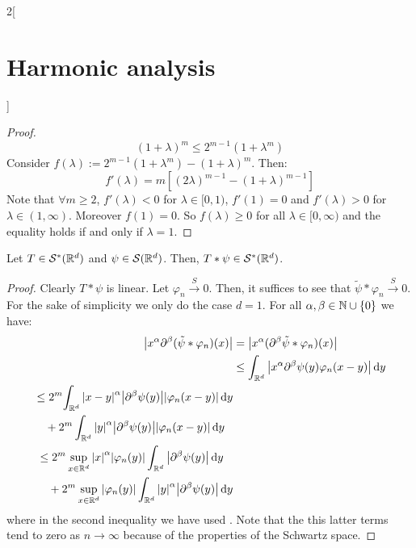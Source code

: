 \documentclass[../../../main_math.tex]{subfiles}
\begin{document}
\begin{multicols}{2}[\section{Harmonic analysis}]
\begin{proof}
    $$
      {(1+\lambda)}^m\leq 2^{m-1}(1+\lambda^m)
    $$
    Consider $f(\lambda):=2^{m-1}(1+\lambda^m)-{(1+\lambda)}^m$. Then:
    $$
      f'(\lambda)=m\left[{(2\lambda)}^{m-1}-{(1+\lambda)}^{m-1}\right]
    $$
    Note that $\forall m\geq 2$, $f'(\lambda)<0$ for $\lambda\in[0,1)$, $f'(1)=0$ and $f'(\lambda)>0$ for $\lambda\in(1,\infty)$. Moreover $f(1)=0$. So $f(\lambda)\geq 0$ for all $\lambda\in [0,\infty)$ and the equality holds if and only if $\lambda=1$.
  \end{proof}
  \begin{lemma}
    Let $T\in \mathcal{S}^*(\mathbb{R}^d)$ and $\psi\in \mathcal{S}(\mathbb{R}^d)$. Then, $T*\psi\in \mathcal{S}^*(\mathbb{R}^d)$.
  \end{lemma}
  \begin{proof}
    Clearly $T*\psi$ is linear. Let $\varphi_n\overset{S}{\longrightarrow}0$. Then, it suffices to see that $\tilde\psi*\varphi_n\overset{S}{\longrightarrow}0$. For the sake of simplicity we only do the case $d=1$. For all $\alpha,\beta\in{\ensuremath{\mathbb{N}}\cup\{0\}}$ we have:
    \begin{align*}
      \abs{{x}^\alpha \partial^\beta(\tilde\psi*\varphi_n)({x})} & =\abs{{x}^\alpha (\partial^\beta\tilde\psi*\varphi_n)({x})}                                                                           \\
                                                                 & \leq \int_{\mathbb{R}^d} \abs{{x}^\alpha \partial^\beta\psi(y)\varphi_n({x}-{y})}\dd{y}                                                      \\
      \begin{split}
        & \leq 2^m\!\int_{\mathbb{R}^d} \abs{{x}-{y}}^\alpha \abs{\partial^\beta\psi({y})}\abs{\varphi_n({x}-{y})}\dd{{y}} \\
        &\quad+2^m\int_{\mathbb{R}^d} \abs{{y}}^\alpha\abs{\partial^\beta\psi({y})} \abs{\varphi_n({x}-{y})}\dd{{y}} \\
      \end{split} \\
      \begin{split}
        & \leq 2^m\sup_{{x}\in\mathbb{R}^d}\abs{{x}}^\alpha\abs{\varphi_n({y})}\int_{\mathbb{R}^d}  \abs{\partial^\beta\psi({y})}\dd{{y}} \\
        &\quad+2^m\sup_{{x}\in\mathbb{R}^d}\abs{\varphi_n({y})}\int_{\mathbb{R}^d} \abs{{y}}^\alpha\abs{\partial^\beta\psi({y})}\dd{{y}} \\
      \end{split}
    \end{align*}
    where in the second inequality we have used . Note that the this latter terms tend to zero as $n\to\infty$ because of the properties of the Schwartz space.

\end{proof}
\end{multicols}
\end{document}
